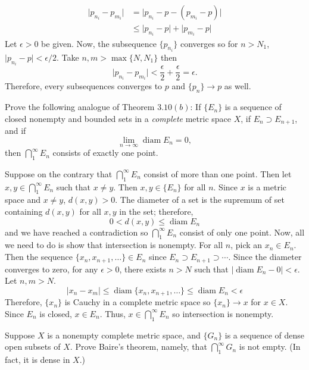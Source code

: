 \begin{exercise}
  \begin{align*}
    \lvert p_{n_i} - p_{m_i}\rvert
    & = \lvert p_{n_i} - p - (p_{m_i} - p)\rvert\\
    & \leq \lvert p_{n_i} - p\rvert + \lvert p_{m_i} - p\rvert
  \end{align*}
  Let \(\epsilon > 0\) be given.
  Now, the subsequence \(\{p_{n_i}\}\) converges so for \(n > N_1\),
  \(\lvert p_{n_i} - p\rvert < \epsilon/2\).
  Take \(n,m > \max\{N, N_1\}\) then
  \[
  \lvert p_{n_i} - p_{m_i}\rvert < \frac{\epsilon}{2} + \frac{\epsilon}{2}
  = \epsilon.
  \]
  Therefore, every subsequences converges to \(p\) and \(\{p_n\}\to p\) as
  well.
\item
  \label{3.21}
  Prove the following analogue of Theorem \(3.10(b)\): If \(\{E_n\}\) is a
  sequence of closed nonempty and bounded sets in a \textit{complete} metric
  space \(X\), if \(E_n\supset E_{n + 1}\), and if
  \[
  \lim_{n\to\infty}\operatorname{diam} E_n = 0,
  \]
  then \(\bigcap_1^{\infty}E_n\) consists of exactly one point.
  \par\smallskip
  Suppose on the contrary that \(\bigcap_1^{\infty}E_n\) consist of more than
  one point.
  Then let \(x,y\in\bigcap_1^{\infty}E_n\) such that \(x\neq y\).
  Then \(x,y\in\{E_n\}\) for all \(n\).
  Since \(x\) is a metric space and \(x\neq y\), \(d(x,y) > 0\).
  The diameter of a set is the supremum of set containing \(d(x,y)\) for all
  \(x,y\) in the set; therefore,
  \[
  0 < d(x,y)\leq\operatorname{diam} E_n
  \]
  and we have reached a contradiction so \(\bigcap_1^{\infty}E_n\) consist of
  only one point.
  Now, all we need to do is show that intersection is nonempty.
  For all \(n\), pick an \(x_n\in E_n\).
  Then the sequence \(\{x_n,x_{n + 1},\ldots\}\in E_n\) since
  \(E_n\supset E_{n + 1}\supset\cdots\).
  Since the diameter converges to zero, for any \(\epsilon > 0\), there exists
  \(n > N\) such that \(\lvert\operatorname{diam}E_n - 0\rvert < \epsilon\).
  Let \(n,m > N\).
  \[
  \lvert x_n - x_m\rvert\leq\operatorname{diam}\{x_n, x_{n + 1},\ldots\}\leq
  \operatorname{diam}E_n < \epsilon
  \]
  Therefore, \(\{x_n\}\) is Cauchy in a complete metric space so
  \(\{x_n\}\to x\) for \(x\in X\).
  Since \(E_n\) is closed, \(x\in E_n\).
  Thus, \(x\in\bigcap_1^{\infty}E_n\) so intersection is nonempty.
\item
  \label{3.22}
  Suppose \(X\) is a nonempty complete metric space, and \(\{G_n\}\) is a
  sequence of dense open subsets of \(X\).
  Prove Baire's theorem, namely, that \(\bigcap_1^{\infty}G_n\) is not empty.
  (In fact, it is dense in \(X\).)

\end{exercise}
